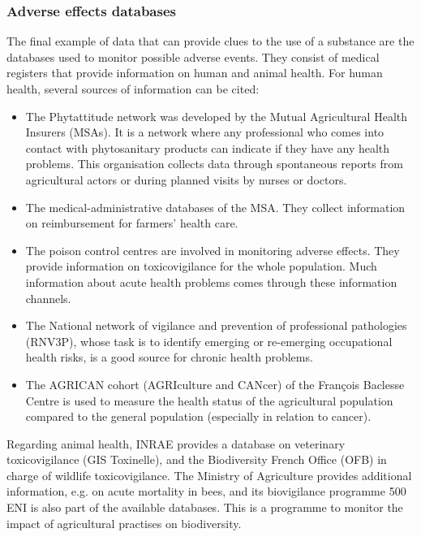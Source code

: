 
\subsubsection{Adverse effects databases}

The final example of data that can provide clues to the use of a substance are the databases used to monitor possible adverse events. They consist of medical registers that provide information on human and animal health. 
For human health, several sources of information can be cited: 
\begin{itemize}
\item The Phytattitude network was developed by the Mutual Agricultural Health Insurers (MSAs). It is a network where any professional who comes into contact with phytosanitary products can indicate if they have any health problems. This organisation collects data through spontaneous reports from agricultural actors or during planned visits by nurses or doctors.
\item The medical-administrative databases of the MSA. They collect information on reimbursement for farmers' health care.
\item The poison control centres are involved in monitoring adverse effects. They provide information on toxicovigilance for the whole population. Much information about acute health problems comes through these information channels.
\item The National network of vigilance and prevention of professional pathologies (RNV3P), whose task is to identify emerging or re-emerging occupational health risks, is a good source for chronic health problems.
\item The AGRICAN cohort (AGRIculture and CANcer) of the François Baclesse Centre is used to measure the health status of the agricultural population compared to the general population (especially in relation to cancer).
\end{itemize}

Regarding animal health, INRAE provides a database on veterinary toxicovigilance (GIS Toxinelle), and the Biodiversity French Office (OFB) in charge of wildlife toxicovigilance. The Ministry of Agriculture provides additional information, e.g. on acute mortality in bees, and its biovigilance programme 500 ENI is also part of the available databases. This is a programme to monitor the impact of agricultural practises on biodiversity.

